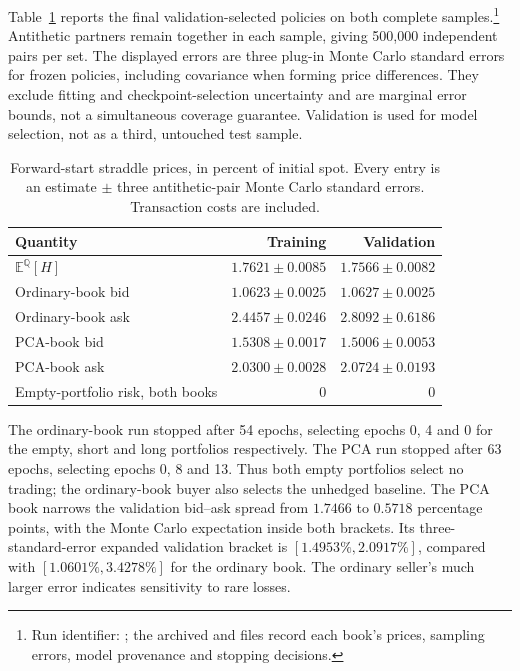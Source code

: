 \documentclass[11pt]{article}
\newcommand{\E}{\mathbb E}
\newcommand{\Q}{\mathbb Q}
\theoremstyle{plain}
\theoremstyle{definition}
\theoremstyle{remark}
\begin{document}
Table~\ref{tab:deep-hedging-two-books} reports the final validation-selected
policies on both complete samples.\footnote{Run identifier:
; the archived
 and  files record each book's
prices, sampling errors, model provenance and stopping decisions.}
Antithetic partners remain together in each sample, giving 500,000
independent pairs per set.  The displayed errors are three plug-in Monte
Carlo standard errors for frozen policies, including covariance when
forming price differences.  They exclude fitting and checkpoint-selection
uncertainty and are marginal error bounds, not a simultaneous coverage
guarantee.  Validation is used for model selection, not as a third,
untouched test sample.

\begin{table}[H]
  \centering
  \small
  \caption{Forward-start straddle prices, in percent of initial spot.
  Every entry is an estimate $\pm$ three antithetic-pair Monte Carlo
  standard errors.  Transaction costs are included.}
  \label{tab:deep-hedging-two-books}
  \begin{tabular}{lrr}
    \toprule
    Quantity & Training & Validation \\
    \midrule
    $\E^\Q[H]$ & $1.7621\pm0.0085$ & $1.7566\pm0.0082$ \\
    Ordinary-book bid & $1.0623\pm0.0025$ & $1.0627\pm0.0025$ \\
    Ordinary-book ask & $2.4457\pm0.0246$ & $2.8092\pm0.6186$ \\
    PCA-book bid & $1.5308\pm0.0017$ & $1.5006\pm0.0053$ \\
    PCA-book ask & $2.0300\pm0.0028$ & $2.0724\pm0.0193$ \\
    Empty-portfolio risk, both books & $0$ & $0$ \\
    \bottomrule
  \end{tabular}
\end{table}

The ordinary-book run stopped after 54 epochs, selecting epochs
0, 4 and 0 for the empty, short and long portfolios respectively.
The PCA run stopped after 63 epochs, selecting epochs 0, 8 and 13.
Thus both empty portfolios select no trading; the ordinary-book buyer
also selects the unhedged baseline.  The PCA book narrows the validation
bid--ask spread from $1.7466$ to $0.5718$ percentage points, with the
Monte Carlo expectation inside both brackets.  Its three-standard-error
expanded validation bracket is $[1.4953\%,2.0917\%]$, compared with
$[1.0601\%,3.4278\%]$ for the ordinary book.  The ordinary seller's much
larger error indicates sensitivity to rare losses.
\end{document}
